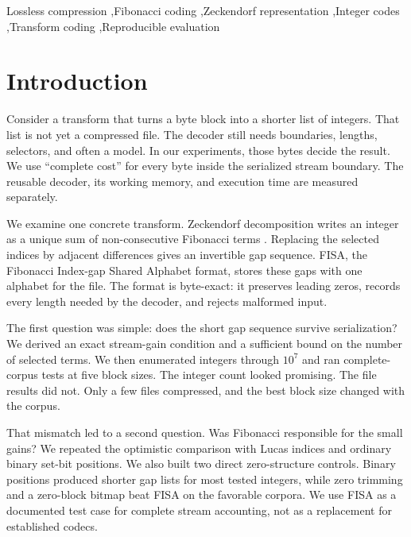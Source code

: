 \documentclass[a4paper,fleqn]{cas-dc}
\begin{document}
\begin{keywords}
Lossless compression \sep Fibonacci coding \sep Zeckendorf representation
\sep Integer codes \sep Transform coding \sep Reproducible evaluation
\end{keywords}

\maketitle

\section{Introduction}
\label{sec:introduction}

Consider a transform that turns a byte block into a shorter list of integers.
That list is not yet a compressed file. The decoder still needs boundaries,
lengths, selectors, and often a model. In our experiments, those bytes decide
the result. We use ``complete cost'' for every byte inside the serialized
stream boundary. The reusable decoder, its working memory, and execution time
are measured separately.

We examine one concrete transform. Zeckendorf decomposition writes an integer
as a unique sum of non-consecutive Fibonacci terms
\cite{Zeckendorf1972}. Replacing the selected indices by adjacent differences
gives an invertible gap sequence. FISA, the Fibonacci Index-gap Shared
Alphabet format, stores these gaps with one alphabet for the file. The format
is byte-exact: it preserves leading zeros, records every length needed by the
decoder, and rejects malformed input.

The first question was simple: does the short gap sequence survive
serialization? We derived an exact stream-gain condition and a sufficient
bound on the number of selected terms. We then enumerated integers through
$10^7$ and ran complete-corpus tests at five block sizes. The integer count
looked promising. The file results did not. Only a few files compressed, and
the best block size changed with the corpus.

That mismatch led to a second question. Was Fibonacci responsible for the
small gains? We repeated the optimistic comparison with Lucas indices and
ordinary binary set-bit positions. We also built two direct zero-structure
controls. Binary positions produced shorter gap lists for most tested
integers, while zero trimming and a zero-block bitmap beat FISA on the
favorable corpora. We use FISA as a documented test case for
complete stream accounting, not as a replacement for established codecs.
\end{document}
